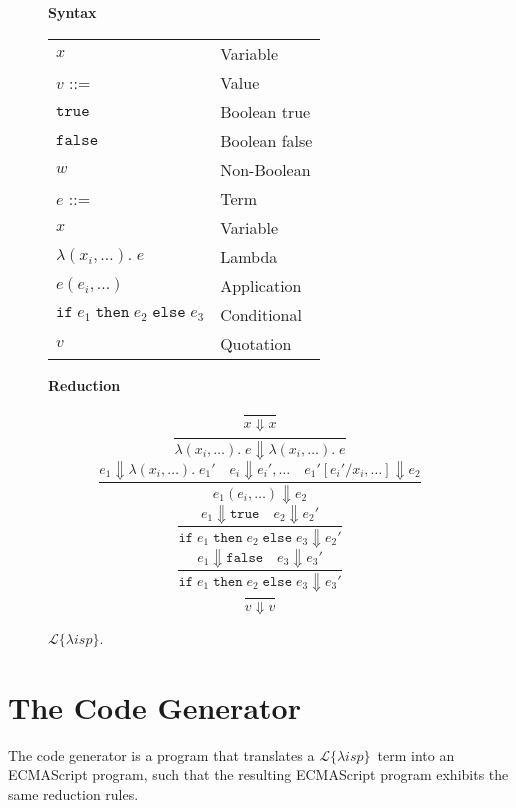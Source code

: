 \documentclass[a4paper]{article}
\newcommand{\lisp}{\ensuremath{\mathcal{L}\{\lambda isp\}}}
\begin{document}
\begin{figure}[h]
\label{fig:lisp}
\caption{\lisp.}

{\bf Syntax}

\begin{tabular}{ll}
$x$ & Variable \\
$v$ ::= & Value \\
\hspace{1em} $\mathtt{true}$ & \hspace{1em} Boolean true \\
\hspace{1em} $\mathtt{false}$ & \hspace{1em} Boolean false \\
\hspace{1em} $w$ & \hspace{1em} Non-Boolean \\
$e$ ::= & Term \\
\hspace{1em} $x$ & \hspace{1em} Variable \\
\hspace{1em} $\lambda(x_i, \dots).\;e$ & \hspace{1em} Lambda \\
\hspace{1em} $e(e_i, \dots)$ & \hspace{1em} Application \\
\hspace{1em} $\mathtt{if}\;e_1\;\mathtt{then}\;e_2\;\mathtt{else}\;e_3$ & \hspace{1em} Conditional \\
\hspace{1em} $v$ & \hspace{1em} Quotation \\
\end{tabular}

\hrulefill

{\bf Reduction}

$$\frac{}{x \Downarrow x}$$
$$\frac{}{\lambda(x_i, \dots).\;e \Downarrow \lambda(x_i, \dots).\;e}$$
$$\frac{e_1 \Downarrow \lambda(x_i, \dots).\;e_1' \quad e_i \Downarrow e_i', \dots \quad e_1'[e_i' / x_i, \dots] \Downarrow e_2}{e_1(e_i, \dots) \Downarrow e_2}$$
$$\frac{e_1 \Downarrow \mathtt{true} \quad e_2 \Downarrow e_2'}{\mathtt{if}\;e_1\;\mathtt{then}\;e_2\;\mathtt{else}\;e_3 \Downarrow e_2'}$$
$$\frac{e_1 \Downarrow \mathtt{false} \quad e_3 \Downarrow e_3'}{\mathtt{if}\;e_1\;\mathtt{then}\;e_2\;\mathtt{else}\;e_3 \Downarrow e_3'}$$
$$\frac{}{v \Downarrow v}$$

\end{figure}

\section{The Code Generator}

The code generator is a program that translates a \lisp\ term into an ECMAScript program, such that the resulting ECMAScript program exhibits the same reduction rules.
\end{document}
